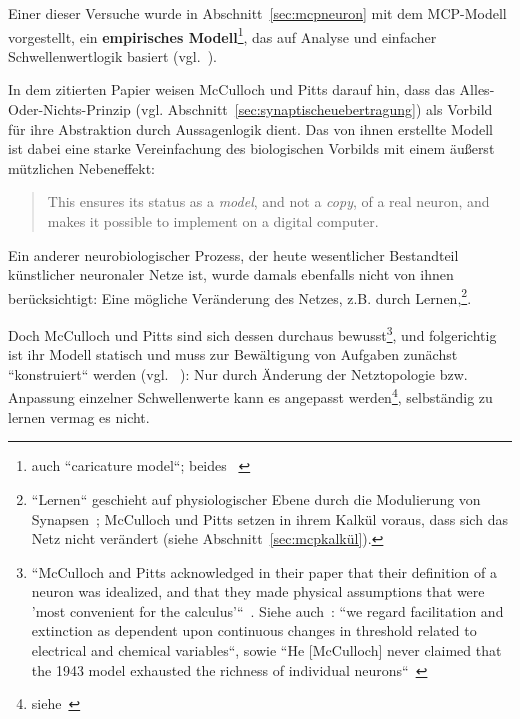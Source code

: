 Einer dieser Versuche wurde in Abschnitt~\ref{sec:mcpneuron} mit dem MCP-Modell vorgestellt, ein \textbf{empirisches Modell}\footnote{
    auch ``caricature model``; beides ~\cite[4]{HI97}
}, das auf Analyse und einfacher Schwellenwertlogik basiert (vgl.~\cite[16]{AR88}).

In dem zitierten Papier weisen McCulloch und Pitts darauf hin, dass das Alles-Oder-Nichts-Prinzip ({vgl.} Abschnitt~\ref{sec:synaptischeuebertragung}) als Vorbild für ihre Abstraktion durch Aussagenlogik dient.
Das von ihnen erstellte Modell ist dabei eine starke Vereinfachung des biologischen Vorbilds mit einem äußerst mützlichen Nebeneffekt:

\blockquote[{\cite[43; Hervorhebung i. O.]{BJ90}}]{
    This ensures its status as a \textit{model}, and not a \textit{copy}, of a real neuron, and makes it possible to implement on a digital computer.
}.

Ein anderer neurobiologischer Prozess, der heute wesentlicher Bestandteil künstlicher neuronaler Netze ist, wurde damals ebenfalls nicht von ihnen berücksichtigt: Eine mögliche Veränderung des Netzes, {z.B.} durch Lernen,\footnote{
    ``Lernen`` geschieht auf physiologischer Ebene durch die Modulierung von Synapsen~\cite[115]{HS19c}; McCulloch und Pitts setzen in ihrem Kalkül voraus, dass sich das Netz nicht verändert (siehe Abschnitt~\ref{sec:mcpkalkül}).
}.

Doch McCulloch und Pitts sind sich dessen durchaus bewusst\footnote{
    ``McCulloch and Pitts acknowledged in their paper that their definition of a neuron was idealized, and that they made physical assumptions that were 'most convenient for the calculus'``~\cite[21]{Abr02}. Siehe auch~\cite[101]{MP43}: ``we regard facilitation and extinction as dependent upon continuous changes in threshold related to electrical and chemical variables``, sowie ``He {[McCulloch]} never claimed that the 1943 model exhausted the richness of individual neurons``~\cite[11]{Arb19}
}, und folgerichtig ist ihr Modell statisch und muss zur Bewältigung von Aufgaben zunächst ``konstruiert`` werden (vgl. ~\cite[28]{Fau94}): Nur durch Änderung der Netztopologie {bzw.} Anpassung einzelner Schwellenwerte kann es angepasst werden\footnote{siehe~\cite[51]{Roj93}}, selbständig zu lernen vermag es nicht.\\


